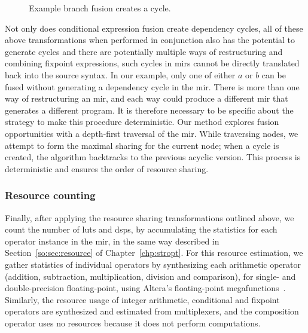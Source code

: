 \begin{figure}[ht]
{
        {}\label{po:fig:mir_cond_fusion_4}
    }
    \caption{Example branch fusion creates a cycle.}
\end{figure}

Not only does conditional expression fusion create dependency cycles, all
of these above transformations when performed in conjunction also has the
potential to generate cycles and there are potentially multiple ways of
restructuring and combining fixpoint expressions, such cycles in \glspl{mir}
cannot be directly translated back into the source syntax.  In our example,
only one of either $a$ or $b$ can be fused without generating a dependency
cycle in the \gls{mir}\@.  There is more than one way of restructuring an
\gls{mir}, and each way could produce a different \gls{mir} that generates a
different program.  It is therefore necessary to be specific about the strategy
to make this procedure deterministic.  Our method explores fusion opportunities
with a depth-first traversal of the \gls{mir}\@.  While traversing nodes,
we attempt to form the maximal sharing for the current node; when a cycle
is created, the algorithm backtracks to the previous acyclic version.  This
process is deterministic and ensures the order of resource sharing.


\subsubsection{Resource counting}

Finally, after applying the resource sharing transformations outlined above, we
count the number of \glspl{lut} and \glspl{dsp}, by accumulating the statistics
for each operator instance in the \gls{mir}, in the same way described in
Section~\ref{so:sec:resource} of Chapter~\ref{chp:stropt}.  For this resource
estimation, we gather statistics of individual operators by synthesizing each
arithmetic operator (addition, subtraction, multiplication, division and
comparison), for single- and double-precision floating-point, using Altera's
floating-point megafunctions~\cite{altfp}.  Similarly, the resource usage of
integer arithmetic, conditional and fixpoint operators are synthesized and
estimated from multiplexers, and the composition operator uses no resources
because it does not perform computations.
